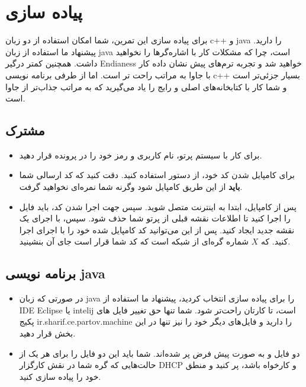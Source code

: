 \section{پیاده سازی}
برای پیاده سازی این تمرین، شما امکان استفاده از دو زبان c++ و java را دارید. پیشنهاد ما استفاده از زبان java است، چرا که مشکلات کار با اشاره‌گر‌ها را نخواهید داشت. همچنین کمتر درگیر Endianess خواهید شد و تجربه ترم‌های پیش نشان داده کار با جاوا به مراتب راحت تر است. اما از طرفی برنامه نویسی c++ بسیار جزئی‌تر است و شما کار با کتابخانه‌های اصلی و رایج را یاد می‌گیرید که به مراتب جذاب‌تر از جاوا است.



\subsection{مشترک}
\begin{itemize}
\item
برای کار با سیستم پرتو، نام کاربری و رمز خود را در پرونده 
 قرار دهید.
\item
برای کامپایل شدن کد خود، از دستور
استفاده کنید. دقت کنید که کد ارسالی شما \textbf{باید} از این طریق کامپایل شود وگرنه شما نمره‌ای نخواهید گرفت.
\item
پس از کامپایل، ابتدا به اینترنت متصل شوید. سپس جهت اجرا شدن کد، باید فایل
را اجرا کنید تا اطلاعات نقشه قبلی از پرتو شما حذف شود. سپس، با اجرای
یک نقشه جدید ایجاد کنید. پس از این می‌توانید کد کامپایل شده خود را با اجرای
اجرا کنید. که $X$ شماره گره‌ای از شبکه است که کد شما قرار است جای آن بنشینید.
\end{itemize}

\subsection{برنامه نویسی java}

\begin{itemize}
\item
در صورتی که زبان java را برای پیاده سازی انتخاب کردید، پیشنهاد ما استفاده از IDE Eclipse یا intelij است، تا کارتان راحت‌تر شود. شما تنها حق تغییر فایل های پکیج ir.sharif.ce.partov.machine را دارید و فایل‌های دیگر خود را نیز تنها در این بخش قرار دهید.
\item
دو فایل 
و
به صورت پیش فرض پر شده‌اند. شما باید این دو فایل را برای هر یک از حالت‌هایی که گره شما در نقش کارگزار DHCP و کارخواه باشد، پر کنید و منطق خود را پیاده سازی کنید.

\end{itemize}
